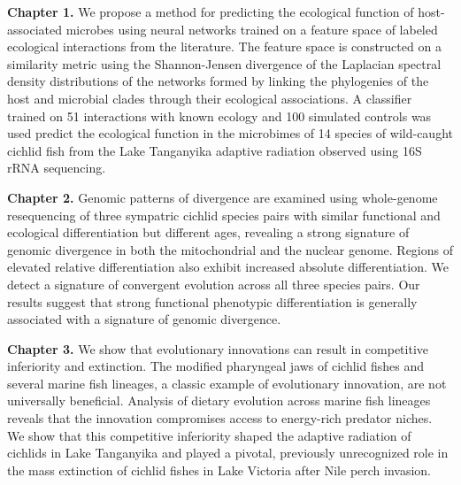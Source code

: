 
\noindent\textbf{Chapter 1.} We propose a method for predicting the ecological function of host-associated
microbes using neural networks trained on a feature space of labeled
ecological interactions from the literature. The feature space is constructed
on a similarity metric using the Shannon-Jensen divergence of the Laplacian
spectral density distributions of the networks formed by linking the
phylogenies of the host and microbial clades through their ecological
associations. A classifier trained on 51 interactions with known ecology and
100 simulated controls was used predict the ecological function in the
microbimes of 14 species of wild-caught cichlid fish from the Lake Tanganyika
adaptive radiation observed using 16S rRNA sequencing.


\noindent\textbf{Chapter 2.} Genomic patterns of divergence are examined using whole-genome resequencing of
three sympatric cichlid species pairs with similar functional and ecological
differentiation but different ages, revealing a strong signature of genomic
divergence in both the mitochondrial and the nuclear genome. Regions of
elevated relative differentiation also exhibit increased absolute
differentiation. We detect a signature of convergent evolution across all
three species pairs. Our results suggest that strong functional phenotypic
differentiation is generally associated with a signature of genomic
divergence.


\noindent\textbf{Chapter 3.} We show that evolutionary innovations can result in competitive inferiority
and extinction. The modified pharyngeal jaws of cichlid fishes and several
marine fish lineages, a classic example of evolutionary innovation, are not
universally beneficial. Analysis of dietary evolution across marine fish
lineages reveals that the innovation compromises access to energy-rich
predator niches. We show that this competitive inferiority shaped the adaptive
radiation of cichlids in Lake Tanganyika and played a pivotal, previously
unrecognized role in the mass extinction of cichlid fishes in Lake Victoria
after Nile perch invasion.

